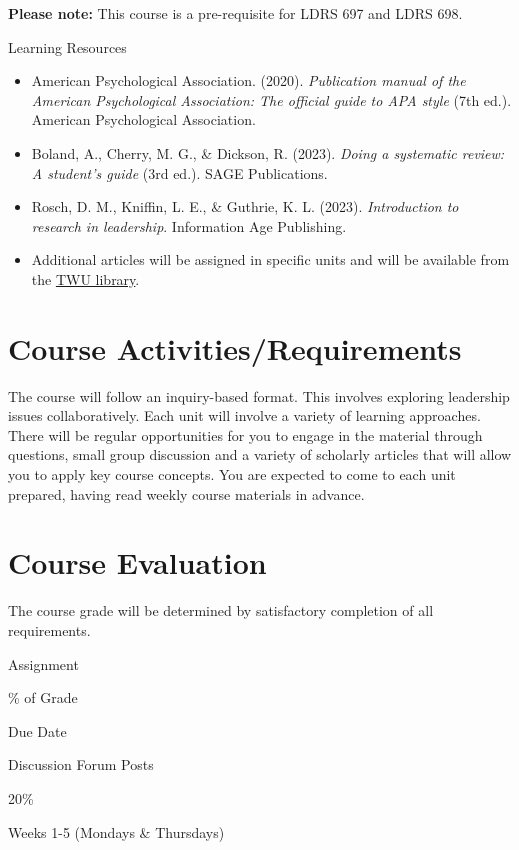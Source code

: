 \documentclass[
  letterpaper,
  DIV=11,
  numbers=noendperiod]{scrreprt}
\providecommand{\tightlist}{%
  \setlength{\itemsep}{0pt}\setlength{\parskip}{0pt}}\usepackage{longtable,booktabs,array}
\begin{document}
\textbf{Please note:} This course is a pre-requisite for LDRS 697 and
LDRS 698.

Learning Resources

\begin{itemize}
\tightlist
\item
  American Psychological Association. (2020). \emph{Publication manual
  of the American Psychological Association: The official guide to APA
  style} (7th ed.). American Psychological Association.
\item
  Boland, A., Cherry, M. G., \& Dickson, R. (2023). \emph{Doing a
  systematic review: A student's guide} (3rd ed.). SAGE Publications.
\item
  Rosch, D. M., Kniffin, L. E., \& Guthrie, K. L. (2023).
  \emph{Introduction to research in leadership}. Information Age
  Publishing.
\item
  Additional articles will be assigned in specific units and will be
  available from the \href{https://www.twu.ca/academics/library}{TWU
  library}.
\end{itemize}

\section{Course
Activities/Requirements}\label{course-activitiesrequirements}

The course will follow an inquiry-based format. This involves exploring
leadership issues collaboratively. Each unit will involve a variety of
learning approaches. There will be regular opportunities for you to
engage in the material through questions, small group discussion and a
variety of scholarly articles that will allow you to apply key course
concepts. You are expected to come to each unit prepared, having read
weekly course materials in advance.

\section{Course Evaluation}\label{course-evaluation}

The course grade will be determined by satisfactory completion of all
requirements.

Assignment

\% of Grade

Due Date

Discussion Forum Posts

20\%

Weeks 1-5 (Mondays \& Thursdays)
\end{document}
